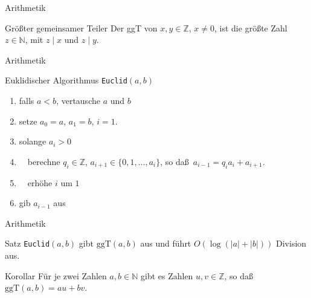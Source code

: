 \documentclass[aspectratio=1610, 11pt]{beamer}
\newcommand\NN{\mathbb N}
\newcommand\ZZ{\mathbb Z}
\newcommand{\ggt}{\mathrm{ggT}}
\begin{document}
\begin{frame}{Arithmetik}
	\begin{exampleblock}{Gr\"o\ss ter gemeinsamer Teiler}
		Der ggT von $x,y\in\ZZ$, $x\neq0$, ist die gr\"o\ss te Zahl $z\in\NN$, mit $z\mid x$ und $z\mid y$.
	\end{exampleblock}
\end{frame}

\begin{frame}{Arithmetik}
	\begin{exampleblock}{Euklidischer Algorithmus {\tt Euclid}$(a,b)$}
		\begin{enumerate}
			\item falls $a<b$, vertausche $a$ und $b$
			\item setze $a_0=a$, $a_1=b$, $i=1$.
			\item solange $a_i>0$
			\item $\quad$berechne $q_i\in\ZZ$, $a_{i+1}\in\{0,1,\ldots,a_i\}$, so da\ss\ $a_{i-1}=q_ia_i+a_{i+1}$.
			\item $\quad$erh\"ohe $i$ um $1$
			\item gib $a_{i-1}$ aus
		\end{enumerate}
	\end{exampleblock}
\end{frame}

\begin{frame}{Arithmetik}
	\begin{block}{Satz}
		{\tt Euclid}$(a,b)$ gibt $\ggt(a,b)$ aus und f\"uhrt $O(\log(|a|+|b|))$ Division aus.
	\end{block}
	\begin{block}{Korollar}
		F\"ur je zwei Zahlen $a,b\in\NN$ gibt es Zahlen $u,v\in\ZZ$, so da\ss\ $\ggt(a,b)=au+bv$.
	\end{block}
\end{frame}
\end{document}
